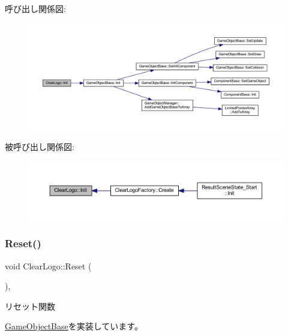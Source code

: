 呼び出し関係図\+:\nopagebreak
\begin{figure}[H]
\begin{center}
\leavevmode
\includegraphics[width=350pt]{class_clear_logo_a46c1a948342d75bb418047a31e70999d_cgraph}
\end{center}
\end{figure}
被呼び出し関係図\+:\nopagebreak
\begin{figure}[H]
\begin{center}
\leavevmode
\includegraphics[width=350pt]{class_clear_logo_a46c1a948342d75bb418047a31e70999d_icgraph}
\end{center}
\end{figure}
\mbox{\label{class_clear_logo_aa19369cbace0cc79957ef7b4d4dbd0f5}} 
\subsubsection{\texorpdfstring{Reset()}{Reset()}}
{\footnotesize\ttfamily void Clear\+Logo\+::\+Reset (\begin{DoxyParamCaption}{ }\end{DoxyParamCaption})\hspace{0.3cm}{\ttfamily [override]}, {\ttfamily [virtual]}}



リセット関数 



\mbox{\hyperlink{class_game_object_base_a85c59554f734bcb09f1a1e18d9517dce}{Game\+Object\+Base}}を実装しています。



